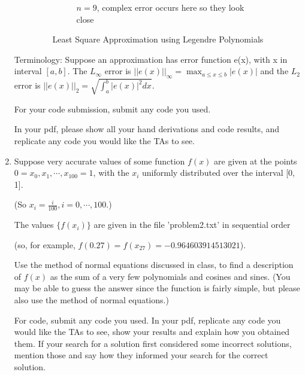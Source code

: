 \documentclass[conference,onecolumn]{IEEEtran}
\begin{document}
\begin{enumerate}[label=\arabic{enumi}.]
\begin{enumerate}
\begin{figure}[H]
\begin{subfigure}{0.49\linewidth}
                                    \caption{$n = 9$, complex error occurs here so they look close}
                              \end{subfigure}
                              \caption{Least Square Approximation using Legendre Polynomials}
                        \end{figure}
            \end{enumerate}
            Terminology: Suppose an approximation has error function e(x), with x in interval $[a, b]$.
            The $L_{\infty}$ error is $||e(x)||_{\infty} = \max_{a \leq x \leq b} |e(x)|$ and the $L_2$ error is $||e(x)||_2 = \sqrt{\int_a^b |e(x)|^2 dx}$.

            For your code submission, submit any code you used.

            In your pdf, please show all your hand derivations and code results, and replicate any code you would like the TAs to see.

            \clearpage
      \item Suppose very accurate values of some function $f (x)$ are given at the points $0 = x_0, x_1, \cdots , x_{100} = 1$, with the ${x_i}$ uniformly distributed over the interval [0, 1].

            (So $x_i = \frac{i}{100}, i = 0, \cdots , 100$.)

            The values $\{f (x_i)\}$ are given in the file 'problem2.txt' in sequential order

            (so, for example, $f (0.27) = f (x_{27}) = -0.964603914513021$).

            Use the method of normal equations discussed in class, to find a description of $f (x)$ as the sum of a very few polynomials and cosines and sines.
            (You may be able to guess the answer since the function is fairly simple, but please also use the method of normal equations.)

            For code, submit any code you used.
            In your pdf, replicate any code you would like the TAs to see, show your results and explain how you obtained them.
            If your search for a solution first considered some incorrect solutions, mention those and say how they informed your search for the correct solution.


\end{enumerate}
\end{document}

